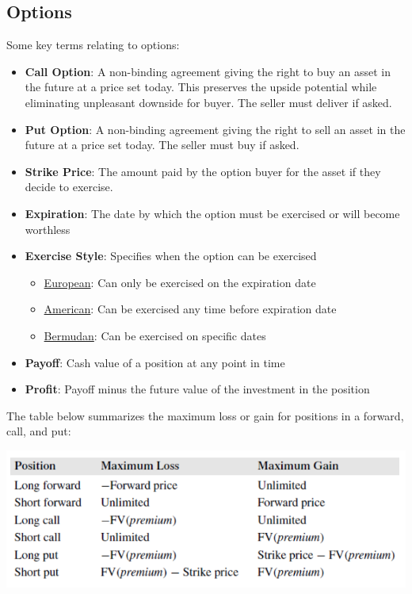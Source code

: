 \documentclass[11pt]{article}
\begin{document}
\subsection{Options}
Some key terms relating to options:
\begin{itemize}
\item \textbf{Call Option}: A non-binding agreement giving the right to buy an asset in the future at a price set today.  This preserves the upside potential while eliminating unpleasant downside for buyer. The seller must deliver if asked.
\item \textbf{Put Option}: A non-binding agreement giving the right to sell an asset in the future at a price set today.  The seller must buy if asked.
\item \textbf{Strike Price}: The amount paid by the option buyer for the asset if they decide to exercise.
\item \textbf{Expiration}: The date by which the option must be exercised or will become worthless
\item \textbf{Exercise Style}: Specifies when the option can be exercised
\begin{itemize}
\item \underline{European}: Can only be exercised on the expiration date
\item \underline{American}: Can be exercised any time before expiration date
\item \underline{Bermudan}: Can be exercised on specific dates
\end{itemize}
\item \textbf{Payoff}: Cash value of a position at any point in time
\item \textbf{Profit}: Payoff minus the future value of the investment in the position
\end{itemize}
The table below summarizes the maximum loss or gain for positions in a forward, call, and put:
\begin{center}
\includegraphics[scale=1]{images/table.png}
\end{center}
\end{document}
